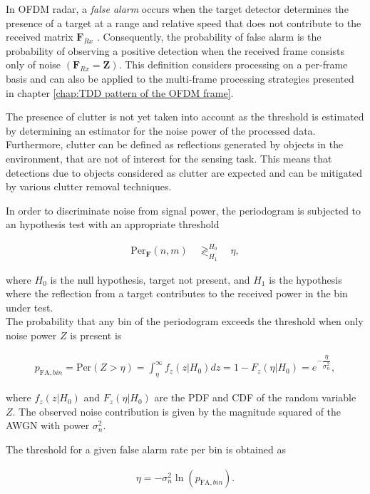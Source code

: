 	In OFDM radar, a \textit{false alarm} occurs when the target detector determines the presence of a target at a range and relative speed that does not contribute to the received matrix $\bm{F}_{Rx}$ \cite{Braun2014OFDMRA}. 
	Consequently, the probability of false alarm is the probability of observing a positive detection when the received frame consists only of noise $(\bm{F}_{Rx} = \bm{Z})$. 
	This definition considers processing on a per-frame basis and can also be applied to the multi-frame processing strategies presented in chapter \ref{chap:TDD pattern of the OFDM frame}. 
	
	The presence of clutter is not yet taken into account as the threshold is estimated by determining an estimator for the noise power of the processed data. 
	Furthermore, clutter can be defined as reflections generated by objects in the environment, that are not of interest for the sensing task. 
	This means that detections due to objects considered as clutter are expected and can be mitigated by various clutter removal techniques.
	
	In order to discriminate noise from signal power, the periodogram is subjected to an hypothesis test with an appropriate threshold
	
	\begin{align}
		\text{Per}_{\bm{F}}(n,m) \quad\mathop{\gtrless}_{H_1}^{H_0}  \quad \eta,
	\end{align}
	
	where $H_0$ is the null hypothesis, target not present, and $H_1$ is the hypothesis where the reflection from a target contributes to the received power in the bin under test.\\
	The probability that any bin of the periodogram exceeds the threshold when only noise power $Z$ is present is
	
	\begin{align}
		p_{\text{FA},bin} = \text{Per}(Z > \eta) = \int_\eta^{\infty} f_z(z|H_0)dz = 1 - F_z(\eta | H_0) = e^{-\dfrac{\eta}{\sigma_n^2}},
	\end{align}
	 
	where $f_z(z|H_0)$ and $F_z(\eta | H_0)$ are the PDF and CDF of the random variable $Z$. 
	The observed noise contribution is given by the magnitude squared of the AWGN with power $\sigma_n^2$.
	 
	The threshold for a given false alarm rate per bin is obtained as
	
	\begin{align}
		\eta = -\sigma_n^2 \ln(p_{\text{FA},bin}) .
	\end{align} 
	

